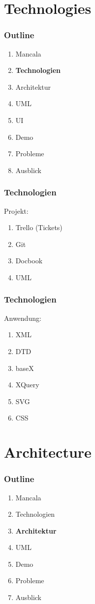 \documentclass[
	10pt,
	t		%
]{beamer}
\begin{document}
\section{Technologies}
\begin{frame}
\frametitle{Outline}
\begin{enumerate}
\item Mancala
\item \textbf{Technologien}
\item Architektur
\item UML
\item UI
\item Demo
\item Probleme
\item Ausblick
\end{enumerate}
\end{frame}

\begin{frame}
\frametitle{Technologien}
Projekt:
\begin{enumerate}
	\item Trello (Tickets)
	\item Git
	\item Docbook
	\item UML
\end{enumerate}
\end{frame}

\begin{frame}
\frametitle{Technologien}
Anwendung:
\begin{enumerate}
	\item XML
	\item DTD
	\item baseX
	\item XQuery
	\item SVG
	\item CSS
\end{enumerate}
\end{frame}

\section{Architecture}
\begin{frame}
\frametitle{Outline}
\begin{enumerate}
\item Mancala
\item Technologien
\item \textbf{Architektur}
\item UML
\item Demo
\item Probleme
\item Ausblick
\end{enumerate}
\end{frame}
\end{document}

